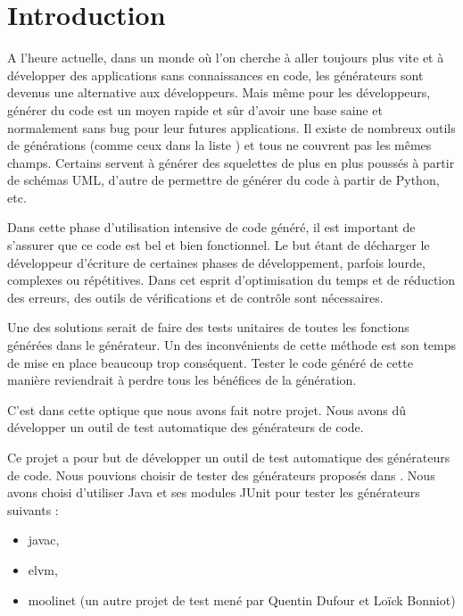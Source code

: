 \chapter*{Introduction}

A l'heure actuelle, dans un monde où l'on cherche à aller toujours plus vite et à développer des applications sans connaissances en code, les générateurs sont devenus une alternative aux développeurs. Mais même pour les développeurs, générer du code est un moyen rapide et sûr d'avoir une base saine et normalement sans bug pour leur futures applications. Il existe de nombreux outils de générations (comme ceux dans la liste \cite{liste_generateurs}) et tous ne couvrent pas les mêmes champs. Certains servent à générer des squelettes de plus en plus poussés à partir de schémas UML, d'autre de permettre de générer du code \jv à partir de Python, etc.

Dans cette phase d'utilisation intensive de code généré, il est important de s'assurer que ce code est bel et bien fonctionnel. Le but étant de décharger le développeur d'écriture de certaines phases de développement, parfois lourde, complexes ou répétitives. Dans cet esprit d'optimisation du temps et de réduction des erreurs, des outils de vérifications et de contrôle sont nécessaires.

Une des solutions serait de faire des tests unitaires de toutes les fonctions générées dans le générateur. Un des inconvénients de cette méthode est son temps de mise en place beaucoup trop conséquent. Tester le code généré de cette manière reviendrait à perdre tous les bénéfices de la génération.

C'est dans cette optique que nous avons fait notre projet. Nous avons dû développer un outil de test automatique des générateurs de code.

\hspace{15pt}


Ce projet a pour but de développer un outil de test automatique des générateurs de code. Nous pouvions choisir de tester des générateurs proposés dans \cite{liste_generateurs}. Nous avons choisi d'utiliser Java et ses modules JUnit pour tester les générateurs suivants :

\begin{itemize}
    \item javac,
    \item elvm,
    \item moolinet \cite{moolinet}(un autre projet de test mené par Quentin Dufour et Loïck Bonniot)
\end{itemize}
